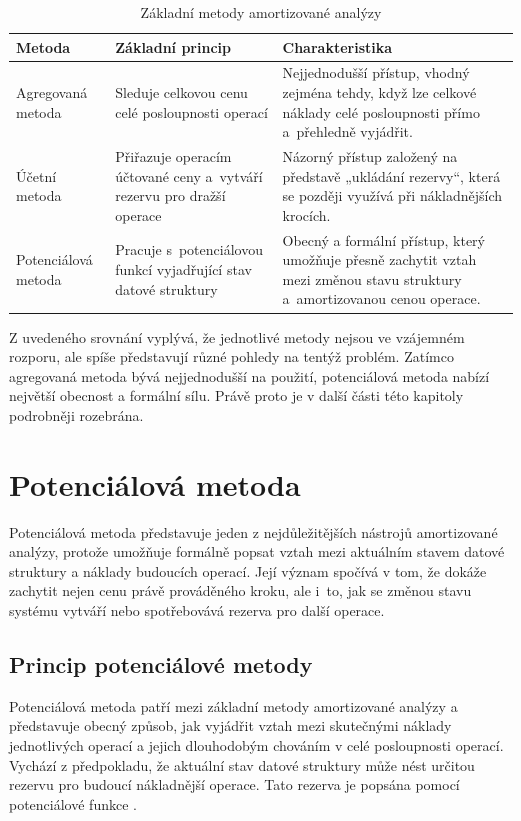 \begin{table}[htbp]
\centering
\caption{Základní metody amortizované analýzy}
\label{tab:methods_amortized_analysis}
\renewcommand{\arraystretch}{1.15}
\begin{tabular}{|L{3.4cm}|L{3.9cm}|L{4.8cm}|}
\hline
    \textbf{Metoda} & \textbf{Základní princip} & \textbf{Charakteristika} \\ \hline
    Agregovaná metoda & Sleduje celkovou cenu celé posloupnosti operací & Nejjednodušší přístup, vhodný zejména tehdy, když lze celkové náklady celé posloupnosti přímo a~přehledně vyjádřit. \\ \hline
    Účetní metoda & Přiřazuje operacím účtované ceny a~vytváří rezervu pro dražší operace & Názorný přístup založený na představě „ukládání rezervy“, která se později využívá při nákladnějších krocích. \\ \hline
    Potenciálová metoda & Pracuje s~potenciálovou funkcí vyjadřující stav datové struktury & Obecný a formální přístup, který umožňuje přesně zachytit vztah mezi změnou stavu struktury a~amortizovanou cenou operace. \\ \hline
\end{tabular}
\end{table}

Z uvedeného srovnání vyplývá, že jednotlivé metody nejsou ve vzájemném rozporu, ale spíše představují různé pohledy na tentýž problém. Zatímco agregovaná metoda bývá nejjednodušší na použití, potenciálová metoda nabízí největší obecnost a formální sílu. Právě proto je v další části této kapitoly podrobněji rozebrána.


\section{Potenciálová metoda}
Potenciálová metoda představuje jeden z nejdůležitějších nástrojů amortizované analýzy, protože umožňuje formálně popsat vztah mezi aktuálním stavem datové struktury a náklady budoucích operací. Její význam spočívá v tom, že dokáže zachytit nejen cenu právě prováděného kroku, ale i~to, jak se změnou stavu systému vytváří nebo spotřebovává rezerva pro další operace.

\subsection{Princip potenciálové metody}
Potenciálová metoda patří mezi základní metody amortizované analýzy a představuje obecný způsob, jak vyjádřit vztah mezi skutečnými náklady jednotlivých operací a jejich dlouhodobým chováním v celé posloupnosti operací. Vychází z předpokladu, že aktuální stav datové struktury může nést určitou rezervu pro budoucí nákladnější operace. Tato rezerva je popsána pomocí potenciálové funkce \cite{tarjan1985amortized}.

